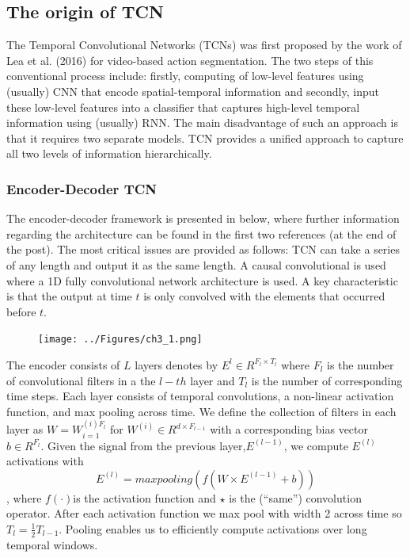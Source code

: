 \subsection{The origin of TCN}
The Temporal Convolutional Networks (TCNs) was first proposed by the work of Lea et al. (2016) for video-based action segmentation. The two steps of this conventional process include: firstly, computing of low-level features using (usually) CNN that encode spatial-temporal information and secondly, input these low-level features into a classifier that captures high-level temporal information using (usually) RNN. The main disadvantage of such an approach is that it requires two separate models. TCN provides a unified approach to capture all two levels of information hierarchically.

\subsubsection{Encoder-Decoder TCN} The encoder-decoder framework is presented in below, where further information regarding the architecture can be found in the first two references (at the end of the post). The most critical issues are provided as follows: TCN can take a series of any length and output it as the same length. A causal convolutional is used where a 1D fully convolutional network architecture is used. A key characteristic is that the output at time $t$ is only convolved with the elements that occurred before $t$. 
\begin{figure}[H]
    \texttt{[image: ../Figures/ch3\_1.png]}
\end{figure}
The encoder consists of $L$ layers denotes by $E^l \in R^{F_l\times T_l}$ where $F_l$ is the number of convolutional filters in a the $l-th$ layer and $T_l$ is the number of corresponding time steps. Each layer consists of temporal convolutions, a non-linear activation function, and max pooling across time. We define the collection of filters in each layer as $W=W^{(i)F_l}_{i=1}$ for $W^{(i)} \in R ^{d \times F_{l-1}}$ with a corresponding bias vector $b \in R^{F_l}$. Given the signal from the previous layer,$E^{(l-1)}$, we compute $E^{(l)}$activations  with $$E^{(l)} = max pooling(f(W \times E^{(l-1)} + b ))$$, where $f(\cdot)$is the activation function and $\star$ is the (“same”) convolution operator. After each activation function we max pool with width 2 across time so $T_l = \frac{1}{2}T_{l-1}$. Pooling enables us to efficiently compute activations over long temporal windows.

